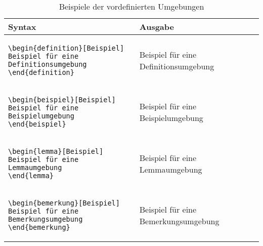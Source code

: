 \begin{table}[htbp]%
\centering
\caption{Beispiele der vordefinierten Umgebungen}
\begin{tabular}{p{8cm}p{7cm}}
Syntax & Ausgabe\\
\toprule
\begin{verbatim}
\begin{definition}[Beispiel]
Beispiel für eine Definitionsumgebung
\end{definition}
\end{verbatim}
&
\begin{definition}[Beispiel]
Beispiel für eine Definitionsumgebung
\end{definition}
\\
\begin{verbatim}
\begin{beispiel}[Beispiel]
Beispiel für eine Beispielumgebung
\end{beispiel}
\end{verbatim}
&
\begin{beispiel}[Beispiel]
Beispiel für eine Beispielumgebung
\end{beispiel}
\\
\begin{verbatim}
\begin{lemma}[Beispiel]
Beispiel für eine Lemmaumgebung
\end{lemma}
\end{verbatim}
&
\begin{lemma}[Beispiel]
Beispiel für eine Lemmaumgebung
\end{lemma}
\\
\begin{verbatim}
\begin{bemerkung}[Beispiel]
Beispiel für eine Bemerkungsumgebung
\end{bemerkung}
\end{verbatim}
&
\begin{bemerkung}[Beispiel]
Beispiel für eine Bemerkungsumgebung
\end{bemerkung}\\
\bottomrule
\end{tabular}
\end{table}

